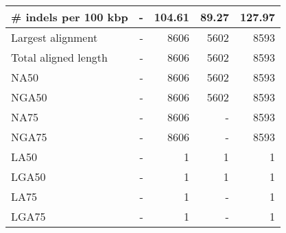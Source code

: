 \documentclass[12pt,a4paper]{article}
\begin{document}
\begin{table}[ht]
\begin{center}
\begin{tabular}{|l*{4}{|r}|}
\# indels per 100 kbp & - & 104.61 & 89.27 & 127.97 \\ \hline
Largest alignment & - & 8606 & 5602 & 8593 \\ \hline
Total aligned length & - & 8606 & 5602 & 8593 \\ \hline
NA50 & - & 8606 & 5602 & 8593 \\ \hline
NGA50 & - & 8606 & 5602 & 8593 \\ \hline
NA75 & - & 8606 & - & 8593 \\ \hline
NGA75 & - & 8606 & - & 8593 \\ \hline
LA50 & - & 1 & 1 & 1 \\ \hline
LGA50 & - & 1 & 1 & 1 \\ \hline
LA75 & - & 1 & - & 1 \\ \hline
LGA75 & - & 1 & - & 1 \\ \hline
\end{tabular}
\end{center}
\end{table}
\end{document}
